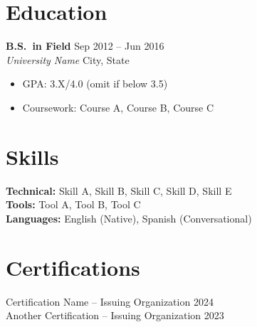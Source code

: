 \documentclass[11pt,a4paper]{article}
\newcommand{\entry}[4]{%
    \noindent\textbf{#1} \hfill #2 \\
    \textit{#3} \hfill #4%
}
\begin{document}
\section{Education}

\entry{B.S.\ in Field}{Sep 2012 -- Jun 2016}{University Name}{City, State}
\begin{itemize}[leftmargin=1.5em, itemsep=0.2em, topsep=0.3em]
    \item GPA: 3.X/4.0 (omit if below 3.5)
    \item Coursework: Course A, Course B, Course C
\end{itemize}

\section{Skills}

\textbf{Technical:} Skill A, Skill B, Skill C, Skill D, Skill E \\
\textbf{Tools:} Tool A, Tool B, Tool C \\
\textbf{Languages:} English (Native), Spanish (Conversational)

\section{Certifications}

\noindent Certification Name -- Issuing Organization \hfill 2024 \\
Another Certification -- Issuing Organization \hfill 2023
\end{document}
